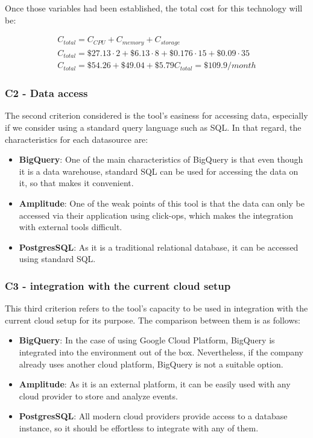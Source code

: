 \documentclass[english, 12pt, a4paper, sci, utf8, a-1b, online]{aaltothesis}
\begin{document}
Once those variables had been established, the total cost for this technology will be:

\begin{equation}
\begin{split}
    C_{total} = C_{CPU} + C_{memory} + C_{storage}\\
    C_{total} = \$27.13 \cdot 2 + \$6.13 \cdot 8 + \$0.176 \cdot 15 + \$0.09 \cdot 35\\
    C_{total} = \$54.26 + \$49.04 + \$5.79
    C_{total} = \$109.9 / month
\end{split}
\end{equation}

\subsubsection*{C2 - Data access}

The second criterion considered is the tool's easiness for accessing data, especially if we consider using a standard query language such as SQL. In that regard, the characteristics for each datasource are:
\begin{itemize}
    \item \textbf{BigQuery}: One of the main characteristics of BigQuery is that even though it is a data warehouse, standard SQL can be used for accessing the data on it, so that makes it convenient.
    \item \textbf{Amplitude}: One of the weak points of this tool is that the data can only be accessed via their application using click-ops, which makes the integration with external tools difficult.
    \item \textbf{PostgresSQL}: As it is a traditional relational database, it can be accessed using standard SQL.
\end{itemize}

\subsubsection*{C3 - integration with the current cloud setup}

This third criterion refers to the tool's capacity to be used in integration with the current cloud setup for its purpose. The comparison between them is as follows:

\begin{itemize}
    \item \textbf{BigQuery}: In the case of using Google Cloud Platform, BigQuery is integrated into the environment out of the box. Nevertheless, if the company already uses another cloud platform, BigQuery is not a suitable option.
    \item \textbf{Amplitude}: As it is an external platform, it can be easily used with any cloud provider to store and analyze events. 
    \item \textbf{PostgresSQL}: All modern cloud providers provide access to a database instance, so it should be effortless to integrate with any of them. 
\end{itemize}
\end{document}
